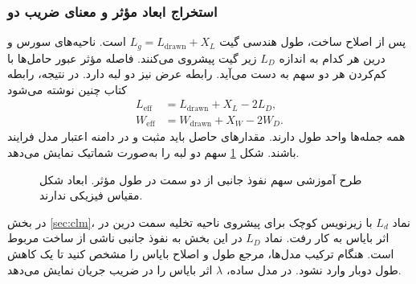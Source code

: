 \subsubsection*{استخراج ابعاد مؤثر و معنای ضریب دو}
پس از اصلاح ساخت، طول هندسی گیت
\(L_g=L_{\mathrm{drawn}}+X_L\) است. ناحیه‌های سورس و درین هر کدام
به اندازه \(L_D\) زیر گیت پیشروی می‌کنند. فاصله مؤثر عبور حامل‌ها
با کم‌کردن هر دو سهم به دست می‌آید. رابطه عرض نیز دو لبه دارد.
در نتیجه، رابطه  کتاب چنین نوشته می‌شود
\begin{align}
 L_{\mathrm{eff}}&=L_{\mathrm{drawn}}+X_L-2L_D,
 \label{eq:geometry-effective-length}\\
 W_{\mathrm{eff}}&=W_{\mathrm{drawn}}+X_W-2W_D.
 \label{eq:geometry-effective-width}
\end{align}
همه جمله‌ها واحد طول دارند. مقدارهای حاصل باید مثبت و در دامنه
اعتبار مدل فرایند باشند. شکل \ref{fig:geometry-length} سهم دو لبه
را به‌صورت شماتیک نمایش می‌دهد.
\begin{figure}[!htbp]
\centering
\begin{latin}
\PersianMathDigits
{}
\end{latin}
\caption{طرح آموزشی سهم نفوذ جانبی از دو سمت در طول مؤثر.
ابعاد شکل مقیاس فیزیکی ندارند.}
\label{fig:geometry-length}
\end{figure}

در بخش \ref{sec:clm}، نماد \(L_d\) با زیرنویس کوچک برای پیشروی
ناحیه تخلیه سمت درین در اثر بایاس به کار رفت. نماد \(L_D\) در این
بخش به نفوذ جانبی ناشی از ساخت مربوط است. هنگام ترکیب مدل‌ها، مرجع
طول و اصلاح بایاس را مشخص کنید تا یک کاهش طول دوبار وارد نشود.
در مدل  ساده، \(\lambda\) اثر بایاس را در ضریب جریان
نمایش می‌دهد.

